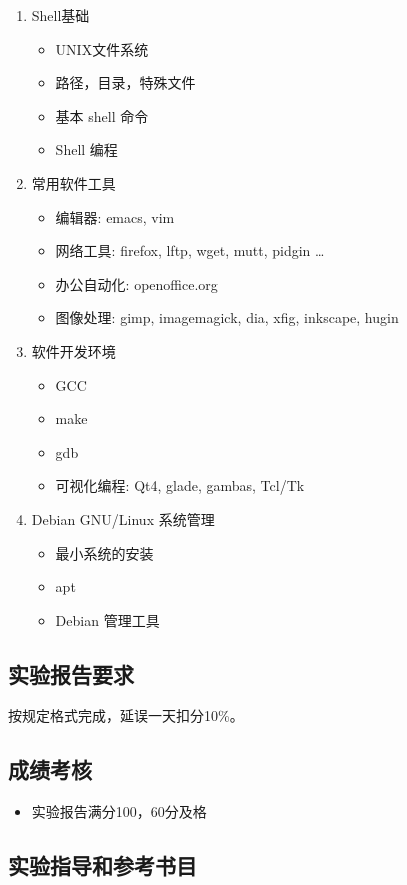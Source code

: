 \documentclass{wx672article}
\begin{document}
\begin{enumerate}
\item Shell基础
  \begin{itemize}
  \item UNIX文件系统
  \item 路径，目录，特殊文件
  \item 基本 shell 命令
  \item Shell 编程
  \end{itemize}
\item 常用软件工具
  \begin{itemize}
  \item 编辑器: emacs, vim
  \item 网络工具: firefox, lftp, wget, mutt, pidgin \ldots{}
  \item 办公自动化: openoffice.org
  \item 图像处理: gimp, imagemagick, dia, xfig, inkscape, hugin
  \end{itemize}
\item 软件开发环境
  \begin{itemize}
  \item GCC
  \item make
  \item gdb
  \item 可视化编程: Qt4, glade, gambas, Tcl/Tk
  \end{itemize}
\item Debian GNU/Linux 系统管理
  \begin{itemize}
  \item 最小系统的安装
  \item apt
  \item Debian 管理工具
  \end{itemize}
\end{enumerate}

\subsection{实验报告要求}
按规定格式完成，延误一天扣分10\%。

\subsection{成绩考核}

\begin{itemize}
\item 实验报告满分100，60分及格
\end{itemize}

\subsection{实验指导和参考书目}
\end{document}
